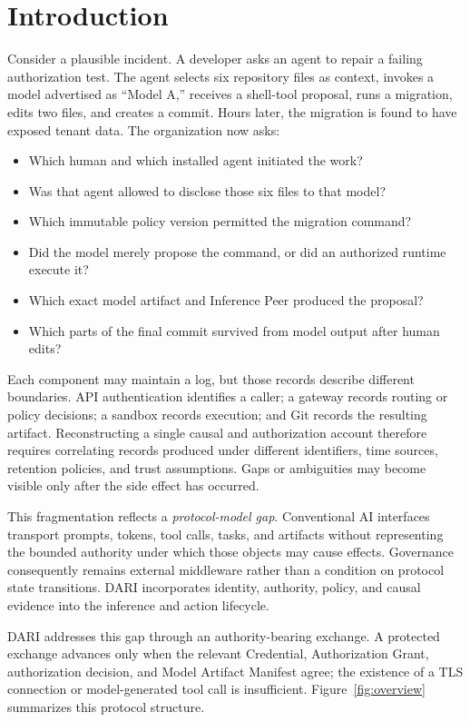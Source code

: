 \documentclass[10pt]{article}
\newcommand{\dariname}{DARI}
\begin{document}
\section{Introduction}

Consider a plausible incident. A developer asks an agent to repair a failing authorization test. The agent selects six repository files as context, invokes a model advertised as ``Model A,'' receives a shell-tool proposal, runs a migration, edits two files, and creates a commit. Hours later, the migration is found to have exposed tenant data. The organization now asks:

\begin{itemize}
  \item Which human and which installed agent initiated the work?
  \item Was that agent allowed to disclose those six files to that model?
  \item Which immutable policy version permitted the migration command?
  \item Did the model merely propose the command, or did an authorized runtime execute it?
  \item Which exact model artifact and Inference Peer produced the proposal?
  \item Which parts of the final commit survived from model output after human edits?
\end{itemize}

Each component may maintain a log, but those records describe different boundaries. API authentication identifies a caller; a gateway records routing or policy decisions; a sandbox records execution; and Git records the resulting artifact. Reconstructing a single causal and authorization account therefore requires correlating records produced under different identifiers, time sources, retention policies, and trust assumptions. Gaps or ambiguities may become visible only after the side effect has occurred.

This fragmentation reflects a \emph{protocol-model gap}. Conventional AI interfaces transport prompts, tokens, tool calls, tasks, and artifacts without representing the bounded authority under which those objects may cause effects. Governance consequently remains external middleware rather than a condition on protocol state transitions. DARI incorporates identity, authority, policy, and causal evidence into the inference and action lifecycle.

\dariname{} addresses this gap through an authority-bearing exchange. A protected exchange advances only when the relevant Credential, Authorization Grant, authorization decision, and Model Artifact Manifest agree; the existence of a TLS connection or model-generated tool call is insufficient. Figure~\ref{fig:overview} summarizes this protocol structure.
\end{document}
